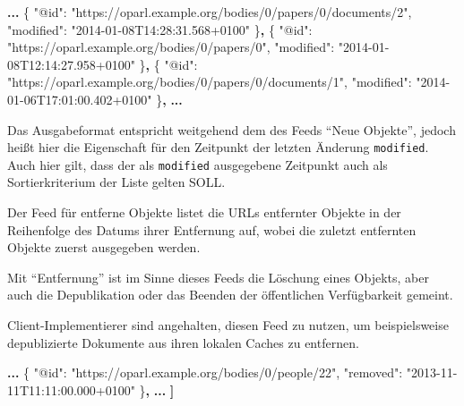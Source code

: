 \documentclass[,a4paper]{article}
\newenvironment{Shaded}{}{}
\newcommand{\DataTypeTok}[1]{\textcolor[rgb]{0.56,0.13,0.00}{{#1}}}
\newcommand{\StringTok}[1]{\textcolor[rgb]{0.25,0.44,0.63}{{#1}}}
\newcommand{\FunctionTok}[1]{\textcolor[rgb]{0.02,0.16,0.49}{{#1}}}
\newcommand{\ErrorTok}[1]{\textcolor[rgb]{1.00,0.00,0.00}{\textbf{{#1}}}}
\begin{document}
\begin{Shaded}
\begin{Highlighting}[]
\ErrorTok{...}
    \FunctionTok{\{}
        \DataTypeTok{"@id"}\FunctionTok{:} \StringTok{"https://oparl.example.org/bodies/0/papers/0/documents/2"}\FunctionTok{,}
        \DataTypeTok{"modified"}\FunctionTok{:} \StringTok{"2014-01-08T14:28:31.568+0100"}
    \FunctionTok{\}}\ErrorTok{,}
    \FunctionTok{\{}
        \DataTypeTok{"@id"}\FunctionTok{:} \StringTok{"https://oparl.example.org/bodies/0/papers/0"}\FunctionTok{,}
        \DataTypeTok{"modified"}\FunctionTok{:} \StringTok{"2014-01-08T12:14:27.958+0100"}
    \FunctionTok{\}}\ErrorTok{,}
    \FunctionTok{\{}
        \DataTypeTok{"@id"}\FunctionTok{:} \StringTok{"https://oparl.example.org/bodies/0/papers/0/documents/1"}\FunctionTok{,}
        \DataTypeTok{"modified"}\FunctionTok{:} \StringTok{"2014-01-06T17:01:00.402+0100"}
    \FunctionTok{\}}\ErrorTok{,}
\ErrorTok{...}
\end{Highlighting}
\end{Shaded}

Das Ausgabeformat entspricht weitgehend dem des Feeds ``Neue Objekte'',
jedoch heißt hier die Eigenschaft für den Zeitpunkt der letzten Änderung
\texttt{modified}. Auch hier gilt, dass der als \texttt{modified}
ausgegebene Zeitpunkt auch als Sortierkriterium der Liste gelten SOLL.


Der Feed für entferne Objekte listet die URLs entfernter Objekte in der
Reihenfolge des Datums ihrer Entfernung auf, wobei die zuletzt
entfernten Objekte zuerst ausgegeben werden.

Mit ``Entfernung'' ist im Sinne dieses Feeds die Löschung eines Objekts,
aber auch die Depublikation oder das Beenden der öffentlichen
Verfügbarkeit gemeint.

Client-Implementierer sind angehalten, diesen Feed zu nutzen, um
beispielsweise depublizierte Dokumente aus ihren lokalen Caches zu
entfernen.

\begin{Shaded}
\begin{Highlighting}[]
\ErrorTok{...}
    \FunctionTok{\{}
        \DataTypeTok{"@id"}\FunctionTok{:} \StringTok{"https://oparl.example.org/bodies/0/people/22"}\FunctionTok{,}
        \DataTypeTok{"removed"}\FunctionTok{:} \StringTok{"2013-11-11T11:11:00.000+0100"}
    \FunctionTok{\}}\ErrorTok{,}
\ErrorTok{...}
\ErrorTok{]}
\end{Highlighting}
\end{Shaded}
\end{document}
